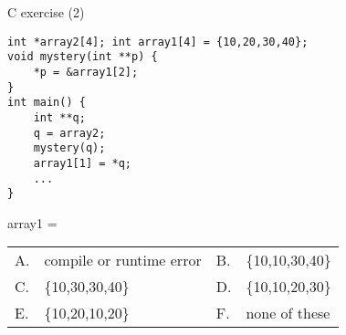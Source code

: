 \begin{frame}[fragile]{C exercise (2)}
\lstset{language=C,style=smaller}
\begin{lstlisting}
int *array2[4]; int array1[4] = {10,20,30,40};
void mystery(int **p) {
    *p = &array1[2];
}
int main() {
    int **q;
    q = array2;
    mystery(q);
    array1[1] = *q;
    ...
}
\end{lstlisting}
array1 = \\
\begin{tabular}{llll}
A. & compile or runtime error   & B. & \{10,10,30,40\} \\
C. & \{10,30,30,40\} & D. & \{10,10,20,30\} \\
E. & \{10,20,10,20\} & F. & none of these \\
\end{tabular}
\end{frame}
